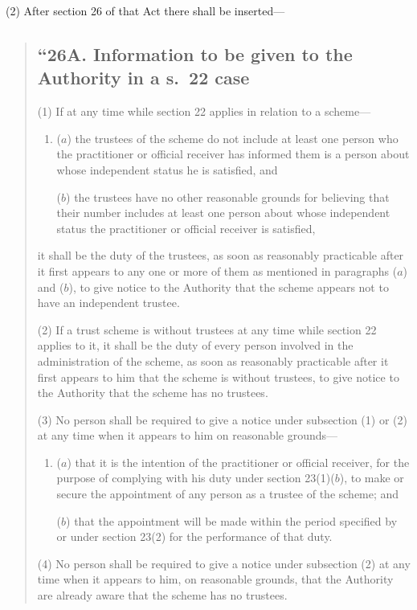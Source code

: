 \documentclass[12pt,a4paper]{article}
\begin{document}
(2) After section 26 of that Act there shall be inserted—
\begin{quotation}
\subsection*{“26A. Information to be given to the Authority in a s.\ 22 case}

(1) If at any time while section 22 applies in relation to a scheme—
\begin{enumerate}\item[]
($a$) the trustees of the scheme do not include at least one person who the practitioner or official receiver has informed them is a person about whose independent status he is satisfied, and

($b$) the trustees have no other reasonable grounds for believing that their number includes at least one person about whose independent status the practitioner or official receiver is satisfied,
\end{enumerate}
it shall be the duty of the trustees, as soon as reasonably practicable after it first appears to any one or more of them as mentioned in paragraphs ($a$)  and ($b$), to give notice to the Authority that the scheme appears not to have an independent trustee.

(2) If a trust scheme is without trustees at any time while section 22 applies to it, it shall be the duty of every person involved in the administration of the scheme, as soon as reasonably practicable after it first appears to him that the scheme is without trustees, to give notice to the Authority that the scheme has no trustees.

(3) No person shall be required to give a notice under subsection (1)  or (2)  at any time when it appears to him on reasonable grounds—
\begin{enumerate}\item[]
($a$) that it is the intention of the practitioner or official receiver, for the purpose of complying with his duty under section 23(1)($b$), to make or secure the appointment of any person as a trustee of the scheme; and

($b$) that the appointment will be made within the period specified by or under section 23(2)  for the performance of that duty.
\end{enumerate}

(4) No person shall be required to give a notice under subsection (2)  at any time when it appears to him, on reasonable grounds, that the Authority are already aware that the scheme has no trustees.


\end{quotation}
\end{document}
